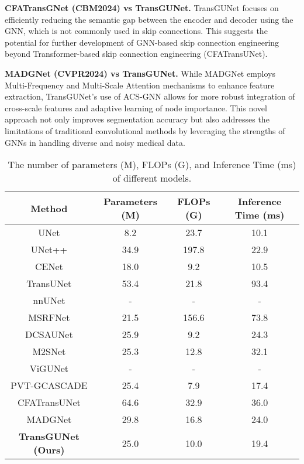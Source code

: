 \noindent \textbf{CFATransGNet (CBM2024) vs TransGUNet.} TransGUNet focuses on efficiently reducing the semantic gap between the encoder and decoder using the GNN, which is not commonly used in skip connections. This suggests the potential for further development of GNN-based skip connection engineering beyond Transformer-based skip connection engineering (CFATransUNet).

\noindent \textbf{MADGNet (CVPR2024) vs TransGUNet.} While MADGNet employs Multi-Frequency and Multi-Scale Attention mechanisms to enhance feature extraction, TransGUNet's use of ACS-GNN allows for more robust integration of cross-scale features and adaptive learning of node importance. This novel approach not only improves segmentation accuracy but also addresses the limitations of traditional convolutional methods by leveraging the strengths of GNNs in handling diverse and noisy medical data.

\begin{table}[t]
    \centering
    \scriptsize
    \setlength\tabcolsep{5.0pt} %
    \begin{tabular}{c|ccc}
    \hline
    Method & Parameters (M) & FLOPs (G) & Inference Time (ms) \\
    \hline
    UNet        & 8.2 & 23.7 & 10.1 \\ 
    UNet++      & 34.9 & 197.8 & 22.9	\\
    CENet       & 18.0 & 9.2 & 10.5 \\ 
    TransUNet   & 53.4 & 21.8 & 93.4 \\
    nnUNet      & - & - & - \\
    MSRFNet     & 21.5 & 156.6 & 73.8 \\
    DCSAUNet    & 25.9 & 9.2 & 24.3 \\
    M2SNet      & 25.3 & 12.8 & 32.1 \\
    ViGUNet     & - & - & - \\
    PVT-GCASCADE & 25.4 & 7.9 & 17.4 \\ 
    CFATransUNet & 64.6 & 32.9 & 36.0 \\
    MADGNet     & 29.8 & 16.8 & 24.0 \\
    \hline
    \textbf{TransGUNet (Ours)} & 25.0 & 10.0 & 19.4 \\
    \hline
    \end{tabular}
    \caption{The number of parameters (M), FLOPs (G), and Inference Time (ms) of different models.}
    \label{tab:efficiency_analysis}
\end{table}

